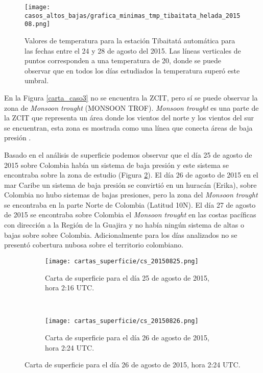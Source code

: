 \begin{itemize}
\begin{figure}[H]
    \centering
    \caption{Valores de temperatura para la estación Tibaitatá automática para las fechas entre el 24 y 28 de agosto del 2015. Las líneas verticales de puntos corresponden a una temperatura de 20\celsius, donde se puede observar que en todos los días estudiados la temperatura superó este umbral.}
    \texttt{[image: casos\_altos\_bajas/grafica\_minimas\_tmp\_tibaitata\_helada\_201508.png]}
    \label{fig:tmp_autom_tibaitata_201508}
\end{figure}

En la Figura \ref{carta_caso3} no se encuentra la ZCIT, pero sí se puede observar la zona de \textit{Monsoon trought} (MONSOON TROF). \textit{Monsoon trought} es una parte de la ZCIT que representa un área donde los vientos del norte y los vientos del sur se encuentran, esta zona es mostrada como una línea que conecta áreas de baja presión \citep{Wang2006}.

Basado en el análisis de superficie podemos observar que el día 25 de agosto de 2015 sobre Colombia había un sistema de baja presión y este sistema se encontraba sobre la zona de estudio (Figura \ref{carta_caso3_20150825}). El día 26 de agosto de 2015 en el mar Caribe un sistema de baja presión se convirtió en un huracán (Erika), sobre Colombia no hubo sistemas de bajas presiones, pero la zona del \textit{Monsoon trought} se encontraba en la parte Norte de Colombia (Latitud 10\degree N). El día 27 de agosto de 2015 se encontraba sobre Colombia el \textit{Monsoon trought} en las costas pacíficas con dirección a la Región de la Guajira y no había ningún sistema de altas o bajas sobre sobre Colombia. Adicionalmente para los días analizados no se presentó cobertura nubosa sobre el territorio colombiano.\\



\begin{figure}[H]
\begin{subfigure}[normla]{0.5\textwidth}
\caption{Carta de superficie para el día 25 de agosto de 2015, hora 2:16 UTC.}
\texttt{[image: cartas\_superficie/cs\_20150825.png]}
\label{carta_caso3_20150825}
\end{subfigure}
~
\begin{subfigure}[normla]{0.5\textwidth}
\caption{Carta de superficie para el día 26 de agosto de 2015, hora 2:24 UTC.}
\texttt{[image: cartas\_superficie/cs\_20150826.png]}
\label{carta_caso3_20150826}
\end{subfigure}


\end{figure}
\end{itemize}
